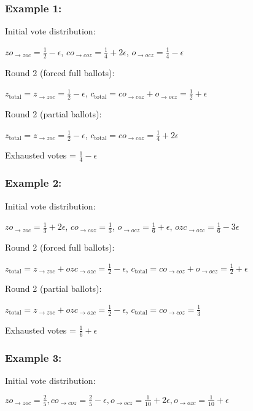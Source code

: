 \documentclass[12pt]{article}
\begin{document}
\subsubsection*{Example 1:}
Initial vote distribution: 

$zo_{\rightarrow zoc} = \frac{1}{2} - \epsilon$, $co_{\rightarrow coz} = \frac{1}{4} + 2\epsilon$, $o_{\rightarrow ocz} = \frac{1}{4} - \epsilon$

Round 2 (forced full ballots):

$z_{\text{total}} = z_{\rightarrow zoc} = \frac{1}{2} - \epsilon$, $c_{\text{total}} = co_{\rightarrow coz} + o_{\rightarrow ocz} = \frac{1}{2} + \epsilon$

Round 2 (partial ballots):

$z_{\text{total}} = z_{\rightarrow zoc} = \frac{1}{2} - \epsilon$, $c_{\text{total}} = co_{\rightarrow coz} = \frac{1}{4} + 2\epsilon$

Exhausted votes = $\frac{1}{4} - \epsilon$

\subsubsection*{Example 2:}
Initial vote distribution: 

$zo_{\rightarrow zoc} = \frac{1}{3} + 2\epsilon$, $co_{\rightarrow coz} = \frac{1}{3}$, $o_{\rightarrow ocz} = \frac{1}{6} + \epsilon$, $ozc_{\rightarrow ozc} = \frac{1}{6} - 3\epsilon$

Round 2 (forced full ballots):

$z_{\text{total}} = z _{\rightarrow zoc} + ozc_{\rightarrow ozc} = \frac{1}{2} - \epsilon$, $c_{\text{total}} = co_{\rightarrow coz} + o_{\rightarrow ocz} = \frac{1}{2} + \epsilon$

Round 2 (partial ballots):

$z_{\text{total}} = z_{\rightarrow zoc} + ozc_{\rightarrow ozc} = \frac{1}{2} - \epsilon$, $c_{\text{total}} = co_{\rightarrow coz} = \frac{1}{3}$

Exhausted votes = $\frac{1}{6} + \epsilon$

\subsubsection*{Example 3:}

Initial vote distribution:

$zo_{\rightarrow zoc} = \frac{2}{5}, co_{\rightarrow coz} = \frac{2}{5} - \epsilon, o_{\rightarrow ocz} = \frac{1}{10} + 2\epsilon, o_{\rightarrow ozc} = \frac{1}{10} + \epsilon$
\end{document}
